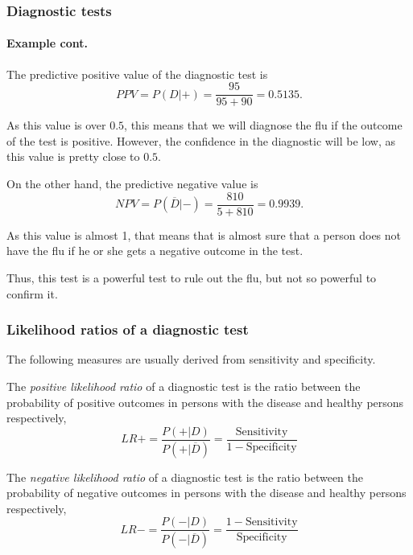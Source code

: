 \begin{frame}
\frametitle{Diagnostic tests}
\framesubtitle{Example cont.}
The predictive positive value of the diagnostic test is
\[
PPV = P(D|+) = \frac{95}{95+90} = 0.5135.
\]

As this value is over $0.5$, this means that we will diagnose the flu if the outcome of the test is positive. 
However, the confidence in the diagnostic will be low, as this value is pretty close to $0.5$.

On the other hand, the predictive negative value is 
\[
NPV = P(\overline{D}|-) = \frac{810}{5+810} = 0.9939. 
\]

As this value is almost 1, that means that is almost sure that a person does not have the flu if he or she gets a
negative outcome in the test. 

Thus, this test is a powerful test to rule out the flu, but not so powerful to confirm it.    
\end{frame}


\begin{frame}
\frametitle{Likelihood ratios of a diagnostic test}
The following measures are usually derived from sensitivity and specificity.
\begin{definition}
The \emph{positive likelihood ratio} of a diagnostic test is the ratio between the probability of positive outcomes in
persons with the disease and healthy persons respectively,
\[
LR+=\frac{P(+|D)}{P(+|\overline{D})} = \frac{\mbox{Sensitivity}}{1-\mbox{Specificity}}
\]
\end{definition}

\begin{definition}
The \emph{negative likelihood ratio} of a diagnostic test is the ratio between the probability of negative outcomes in
persons with the disease and healthy persons respectively,
\[
LR-=\frac{P(-|D)}{P(-|\overline{D})} = \frac{1-\mbox{Sensitivity}}{\mbox{Specificity}}
\]
\end{definition}
\end{frame}


